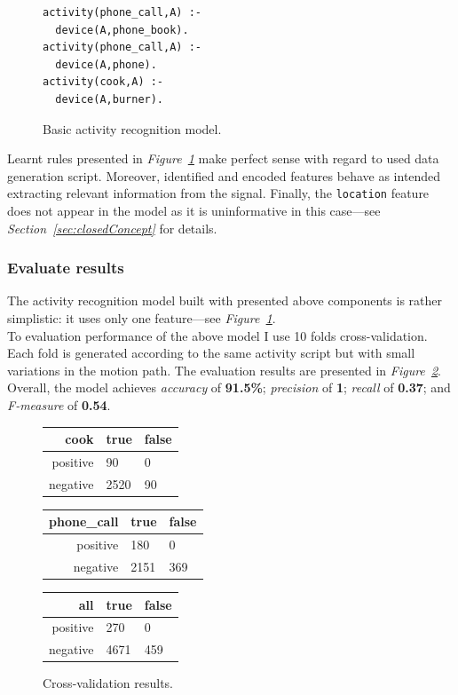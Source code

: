 \documentclass[11pt, a4paper, pdflatex, leqno, twoside, openright]{report}
\begin{document}
\begin{figure}[htb]
  \begin{verbatim}
activity(phone_call,A) :-
  device(A,phone_book).
activity(phone_call,A) :-
  device(A,phone).
activity(cook,A) :-
  device(A,burner).
  \end{verbatim}
  \caption{Basic activity recognition model.\label{lst:alephBasicModel}}
\end{figure}

Learnt rules presented in \emph{Figure~\ref{lst:alephBasicModel}} make perfect sense with regard to used data generation script. Moreover, identified and encoded features behave as intended extracting relevant information from the signal. Finally, the \texttt{location} feature does not appear in the model as it is uninformative in this case---see \emph{Section~\ref{sec:closedConcept}} for details.

      \subsubsection{Evaluate results}
The activity recognition model built with presented above components is rather simplistic: it uses only one feature---see \emph{Figure~\ref{lst:alephBasicModel}}.\\

To evaluation performance of the above model I use 10 folds cross-validation. Each fold is generated according to the same activity script but with small variations in the motion path. The evaluation results are presented in \emph{Figure~\ref{tab:basicStats}}. Overall, the model achieves \emph{accuracy} of \textbf{91.5\%}; \emph{precision} of \textbf{1}; \emph{recall} of \textbf{0.37}; and \emph{F-measure} of \textbf{0.54}.\\

\begin{figure}[htb]
  \centering
  \begin{tabular}{ r | l l}
cook & true & false\\
\hline
positive & 90 & 0\\
negative & 2520 & 90\\
  \end{tabular}
  \begin{tabular}{ r | l l}
phone\_call & true & false\\
\hline
positive & 180 & 0\\
negative & 2151 & 369\\
  \end{tabular}
  \begin{tabular}{ r | l l}
all & true & false\\
\hline
positive & 270 & 0\\
negative & 4671 & 459\\
  \end{tabular}
  \caption{Cross-validation results.\label{tab:basicStats}}
\end{figure}
\end{document}
